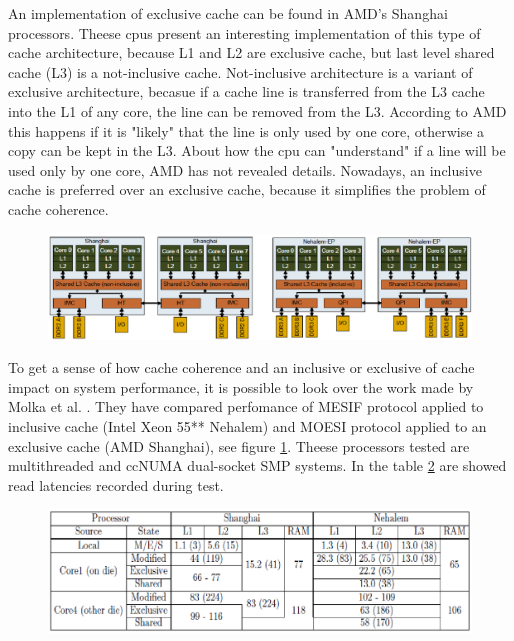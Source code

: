 An implementation of exclusive cache can be found in AMD's Shanghai processors. Theese cpus present an interesting implementation of this type of cache
architecture, because L1 and L2 are exclusive cache, but last level shared cache (L3) is a not-inclusive cache.
Not-inclusive architecture is a variant of exclusive architecture, becasue if a cache line is transferred from the L3 cache into the L1 of any core, the 
line can be removed from the L3. According to AMD this happens if it is "likely" that the line is only used by one core, otherwise a copy can be kept in 
the L3. About how the cpu can "understand" if a line will be used only by one core, AMD has not revealed details. Nowadays, an inclusive cache is 
preferred over an exclusive cache, because it simplifies the problem of cache coherence. 

\begin{figure}[htbp]
\centering
\includegraphics[width=\widefigure]{images/neh_amd.eps}
\caption{}
\label{fig:neh_amd}
\end{figure}

To get a sense of how cache coherence and an inclusive or exclusive of cache impact on system performance, it is possible to look over the work made by 
Molka et al. \cite{molka}. They have compared perfomance of MESIF protocol applied to inclusive cache (Intel Xeon 55** Nehalem) and MOESI protocol applied 
to an exclusive cache (AMD Shanghai), see figure \ref{fig:neh_amd}. Theese processors tested are multithreaded and ccNUMA dual-socket SMP systems. 
In the table \ref{fig:tab_lat} are showed read latencies recorded during test.

\begin{figure}[htbp]
\centering
\includegraphics[width=\widefigure]{images/tab_lat.eps}
\caption{}
\label{fig:tab_lat}
\end{figure}

